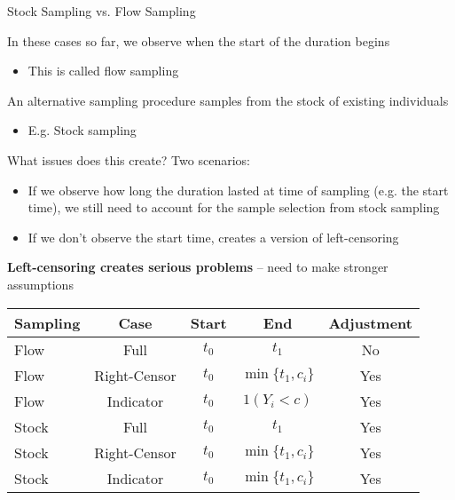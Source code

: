 \documentclass[notes,11pt, aspectratio=169]{beamer}
\newenvironment{wideitemize}{\itemize\addtolength{\itemsep}{10pt}}{\enditemize}
\begin{document}
\begin{frame}{Stock Sampling vs. Flow Sampling}
  \begin{wideitemize}
  \item In these cases so far, we observe when the start of the duration begins
    \begin{itemize}
    \item This is called flow sampling
    \end{itemize}
  \item An alternative sampling procedure samples from the stock of existing individuals
    \begin{itemize}
    \item E.g. Stock sampling
    \end{itemize}
  \item What issues does this create? Two scenarios:
    \begin{itemize}
    \item If we observe how long the duration lasted at time of
      sampling (e.g. the start time), we still need to account for the
      sample selection from stock sampling
    \item If we don't observe the start time, creates a version of
      left-censoring
    \end{itemize}
    \vspace{-5pt}
  \item \textbf{Left-censoring creates serious problems} -- need to make
    stronger assumptions
  \end{wideitemize}
  \begin{center}
    \footnotesize
    \begin{tabular}{lcccc}
      Sampling & Case & Start & End & Adjustment\\
      \midrule
      Flow & Full & $t_{0}$ & $t_{1}$ & No \\
      Flow & Right-Censor & $t_{0}$ & $\min\{{t_{1}, c_{i}}\}$ & Yes\\
      Flow & Indicator   & $t_{0}$ & $1(Y_{i} < c)$ & Yes\\
      Stock & Full & $t_{0}$ & $t_{1}$ & Yes \\
      Stock & Right-Censor & $t_{0}$ & $\min\{{t_{1}, c_{i}}\}$ & Yes\\
      Stock & Indicator & $t_{0}$ & $\min\{{t_{1}, c_{i}}\}$ & Yes\\      
    \end{tabular}
  \end{center}
\end{frame}
\end{document}
